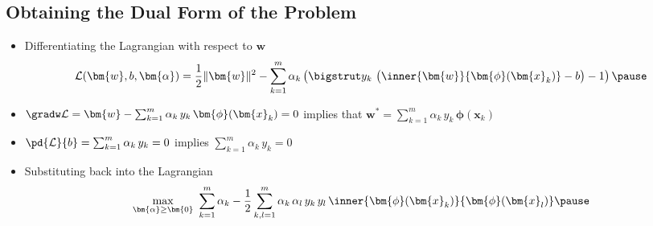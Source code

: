 \begin{slide}
\section[-2]{Obtaining the Dual Form of the Problem}

\begin{PauseHighLight}
  \begin{itemize}
  \item Differentiating the Lagrangian with respect to $\bm{w}$
    \begin{align*}
      \mathcal{L}(\bm{w}, b, \bm{\alpha}) = \frac{1}{2} \|\bm{w}\|^2 
      - \sum_{k=1}^m \alpha_k \left(\bigstrut
      y_k\,\left(\strut \inner{\bm{w}}{\bm{\phi}(\bm{x}_k) }-  b\right) - 1 \right)\pause
    \end{align*}
  \item $\gradw \mathcal{L}=\bm{w} -\sum_{k=1}^m \alpha_k\,y_k\,\bm{\phi}(\bm{x}_k)= 0$ implies that $\bm{w}^* = \sum_{k=1}^m
  \alpha_k\, y_k\, \bm{\phi}(\bm{x}_k)$\pause
  \item $\pd{\mathcal{L}}{b}=\sum_{k=1}^m \alpha_k\, y_k=0$ implies $\sum_{k=1}^m \alpha_k\, y_k = 0$
    \pause
  \item Substituting back into the Lagrangian
   \begin{align*}
      \max_{\bm{\alpha}\geq\bm{0}} \,\, \sum_{k=1}^m \alpha_k 
      - \frac{1}{2} \sum_{k,l=1}^m \alpha_k\,\alpha_l
      \,y_k\,y_l\, \inner{\bm{\phi}(\bm{x}_k)}{\bm{\phi}(\bm{x}_l)} \pause
    \end{align*}    
  \end{itemize}
\end{PauseHighLight}

\end{slide}



